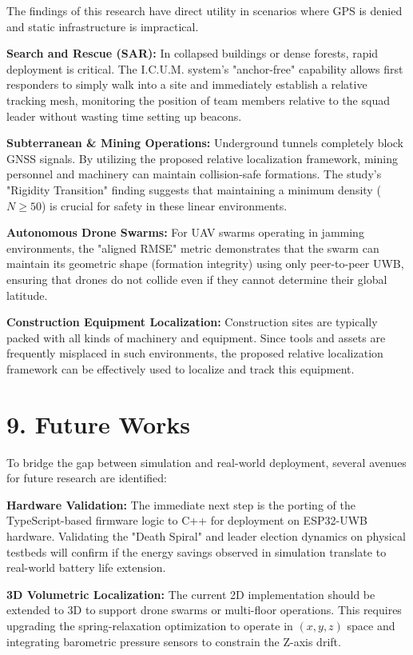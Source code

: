 \noindent The findings of this research have direct utility in scenarios where GPS is denied and static infrastructure is impractical.

\noindent \textbf{Search and Rescue (SAR):} In collapsed buildings or dense forests, rapid deployment is critical. The I.C.U.M. system's "anchor-free" capability allows first responders to simply walk into a site and immediately establish a relative tracking mesh, monitoring the position of team members relative to the squad leader without wasting time setting up beacons.

\noindent \textbf{Subterranean & Mining Operations:} Underground tunnels completely block GNSS signals. By utilizing the proposed relative localization framework, mining personnel and machinery can maintain collision-safe formations. The study's "Rigidity Transition" finding suggests that maintaining a minimum density ($N \ge 50$) is crucial for safety in these linear environments.

\noindent \textbf{Autonomous Drone Swarms:} For UAV swarms operating in jamming environments, the "aligned RMSE" metric demonstrates that the swarm can maintain its geometric shape (formation integrity) using only peer-to-peer UWB, ensuring that drones do not collide even if they cannot determine their global latitude.

\noindent \textbf{Construction Equipment Localization:} Construction sites are typically packed with all kinds of machinery and equipment. Since tools and assets are frequently misplaced in such environments, the proposed relative localization framework can be effectively used to localize and track this equipment.

\section*{9. Future Works}

\noindent To bridge the gap between simulation and real-world deployment, several avenues for future research are identified:

\noindent \textbf{Hardware Validation:} The immediate next step is the porting of the TypeScript-based firmware logic to C++ for deployment on ESP32-UWB hardware. Validating the "Death Spiral" and leader election dynamics on physical testbeds will confirm if the energy savings observed in simulation translate to real-world battery life extension.

\noindent \textbf{3D Volumetric Localization:} The current 2D implementation should be extended to 3D to support drone swarms or multi-floor operations. This requires upgrading the spring-relaxation optimization to operate in $(x, y, z)$ space and integrating barometric pressure sensors to constrain the Z-axis drift.

